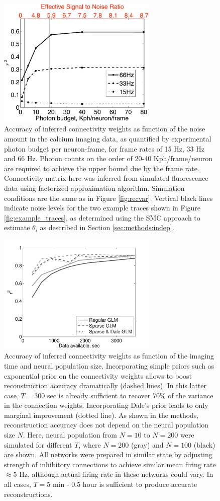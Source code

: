 \begin{figure}[h]
\centering
\includegraphics[width=3in]{../figs/FigureA6_recvar_SNR}
\caption{Accuracy of inferred connectivity weights as function of the noise amount in the calcium imaging data, as quantified by experimental photon budget per neuron-frame, for frame rates of 15 Hz, 33 Hz and 66 Hz. Photon counts on the order of 20-40 Kph/frame/neuron are required to achieve the upper bound due by the frame rate. Connectivity matrix here was inferred from simulated fluorescence data using factorized approximation algorithm. Simulation conditions are the same as in Figure \ref{fig:recvar}.  Vertical black lines indicate noise levels for the two example traces shown in Figure \ref{fig:example_traces}, as determined using the SMC approach to estimate $\theta_i$ as described in Section \ref{sec:methods:indep}.}
\label{fig:recvar-SNR}
\end{figure}

\begin{figure}[h]
\centering
\includegraphics[width=3in]{../figs/FigureA7_recvar_NT}
\caption{Accuracy of inferred connectivity weights as function of the imaging time and neural population size. Incorporating simple priors such as exponential prior on the connectivity weights allows to boost reconstruction accuracy dramatically (dashed lines). In this latter case, $T=300$ sec is already sufficient to recover 70\% of the variance in the connection weights. Incorporating Dale's prior leads to only marginal improvement (dotted line). As shown in the methods, reconstruction accuracy does not depend on the neural population size $N$.
Here, neural population from $N=10$ to $N=200$ were simulated for different $T$, where
$N=200$ (gray) and $N=100$ (black) are shown. All networks were prepared in similar state by adjusting strength of inhibitory connections to achieve similar mean firing rate $\approx 5$ Hz, although actual firing rate in these networks could vary. In all cases, $T=5$ min - 0.5 hour is sufficient to produce accurate reconstructions.
}
\label{fig:recvar-NT}
\end{figure}


